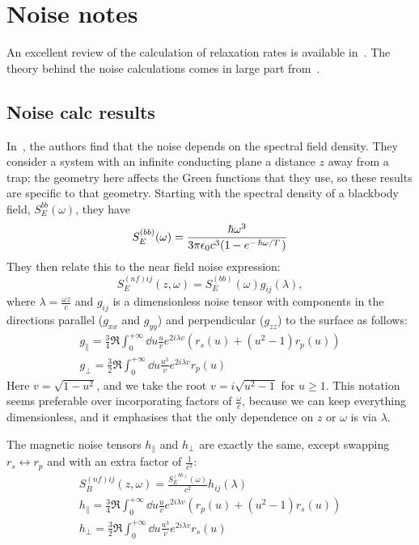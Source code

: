 \documentclass[11pt]{article}
\begin{document}
	\graphicspath{{figures/}}

	\section{Noise notes} \label{sec:NoiseCalc}
	An excellent review of the calculation of relaxation rates is available in~\cite{Henkel1999}.
	The theory behind the noise calculations comes in large part from~\cite{Agarwal1975}.

	\subsection{Noise calc results} \label{subsec:NoiseCalcResults}
	In~\cite{Henkel1999}, the authors find that the noise depends on the spectral field density.
	They consider a system with an infinite conducting plane a distance $z$ away from a trap;
	the geometry here affects the Green functions that they use, so these results are specific to that geometry.
	Starting with the spectral density of a blackbody field, $S^{bb}_E(\omega)$, they have
	\begin{equation}
		S^{(bb)}_E(\omega) = \frac{\hbar \omega^3}{3 \pi \epsilon_0 c^3 (1 - e^{-\flatfrac{\hbar \omega}{T}})}
	\end{equation}
	They then relate this to the near field noise expression:
	\begin{equation}
		S^{(nf)ij}_E(z, \omega) = S^{(bb)}_E(\omega) g_{ij}(\lambda),
	\end{equation}
	where $\lambda = \frac{\omega z}{c}$ and $g_{ij}$ is a dimensionless noise tensor with components in the directions parallel ($g_{xx}$ and $g_{yy}$) and perpendicular ($g_{zz}$) to the surface as follows:
	\begin{gather}
		g_\parallel = \frac34 \Re \int_0^{+\infty} \dd{u} \frac{u}{v} e^{2i \lambda v} \left(r_s(u) + \left(u^2 - 1\right) r_p(u) \right) \\
		g_\perp = \frac32 \Re \int_0^{+\infty} \dd{u} \frac{u^3}{v} e^{2 i \lambda v} r_p(u)
	\end{gather}
	Here $v = \sqrt{1 - u^2}$, and we take the root $v = i \sqrt{u^2 - 1}$ for $u \geq 1$.
	This notation seems preferable over incorporating factors of $\frac{\omega}{c}$, because we can keep everything dimensionless, and it emphasises that the only dependence on $z$ or $\omega$ is via $\lambda$.

	The magnetic noise tensors $h_\parallel$ and $h_\perp$ are exactly the same, except swapping $r_s \leftrightarrow r_p$ and with an extra factor of $\frac{1}{c^2}$:
	\begin{gather}
		S^{(nf)ij}_B(z, \omega) = \frac{S^{(bb)}_E(\omega)}{c^2} h_{ij}(\lambda) \\
		h_\parallel = \frac34 \Re \int_0^{+\infty} \dd{u} \frac{u}{v} e^{2i \lambda v} \left(r_p(u) + \left(u^2 - 1\right) r_s(u) \right) \\
		h_\perp = \frac32 \Re \int_0^{+\infty} \dd{u} \frac{u^3}{v} e^{2 i \lambda v} r_s(u)
	\end{gather}
\end{document}
